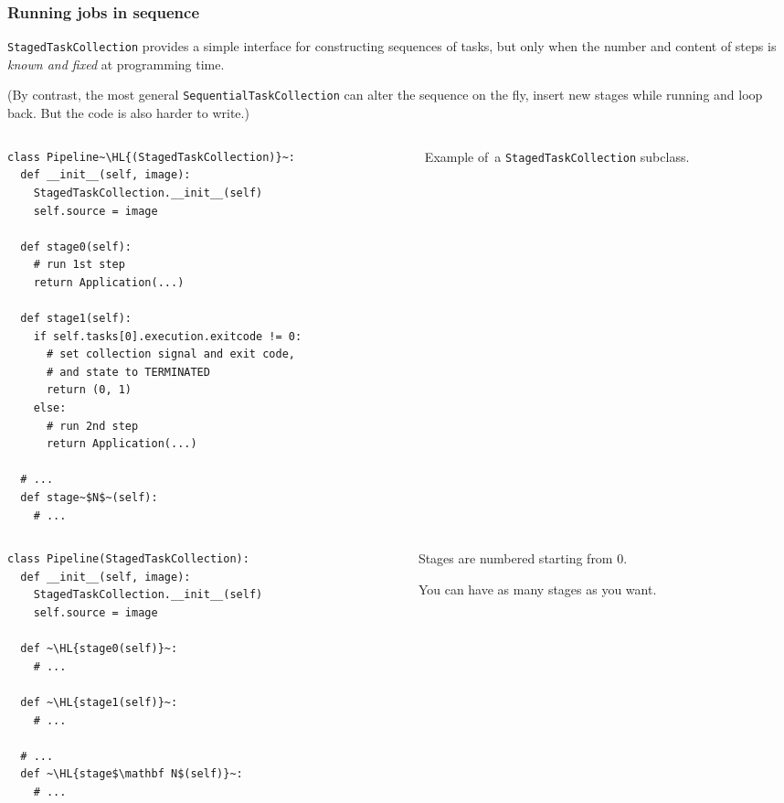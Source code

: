 \documentclass[english,serif,mathserif,xcolor=pdftex,dvipsnames,table]{beamer}
\begin{document}
\begin{frame}[fragile]
  \frametitle{Running jobs in sequence}

  \texttt{StagedTaskCollection} provides a simple interface for
  constructing sequences of tasks, but only when the number and
  content of steps is \emph{known and fixed} at programming time.

  \+
  (By contrast, the most general \texttt{SequentialTaskCollection}
  can alter the sequence on the fly, insert new stages while running
  and loop back. But the code is also harder to write.)
\end{frame}


\begin{frame}[fragile]
  \begin{columns}[t]
    \begin{column}{0.6\textwidth}
      \begin{lstlisting}
class Pipeline~\HL{(StagedTaskCollection)}~:
  def __init__(self, image):
    StagedTaskCollection.__init__(self)
    self.source = image

  def stage0(self):
    # run 1st step
    return Application(...)

  def stage1(self):
    if self.tasks[0].execution.exitcode != 0:
      # set collection signal and exit code,
      # and state to TERMINATED
      return (0, 1)
    else:
      # run 2nd step
      return Application(...)

  # ...
  def stage~$N$~(self):
    # ...
      \end{lstlisting}
    \end{column}
    \begin{column}{0.4\textwidth}
      \raggedleft

      \+\+
      Example of~a \texttt{StagedTaskCollection}
      subclass.
    \end{column}
  \end{columns}
\end{frame}


\begin{frame}[fragile]
  \begin{columns}[c]
    \begin{column}{0.6\textwidth}
      \begin{lstlisting}
class Pipeline(StagedTaskCollection):
  def __init__(self, image):
    StagedTaskCollection.__init__(self)
    self.source = image

  def ~\HL{stage0(self)}~:
    # ...

  def ~\HL{stage1(self)}~:
    # ...

  # ...
  def ~\HL{stage$\mathbf N$(self)}~:
    # ...
      \end{lstlisting}
    \end{column}
    \begin{column}{0.4\textwidth}
      \raggedleft

      Stages are numbered starting from $0$.

      \+
      You can have as many stages as you want.
    \end{column}
  \end{columns}
\end{frame}
\end{document}
